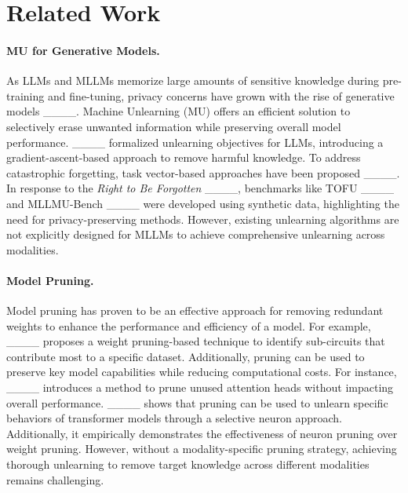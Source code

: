 \section{Related Work}
\paragraph{MU for Generative Models.}
As LLMs and MLLMs memorize large amounts of sensitive knowledge during pre-training and fine-tuning, privacy concerns have grown with the rise of generative models ____. 
Machine Unlearning (MU) offers an efficient solution to selectively erase unwanted information while preserving overall model performance. ____ formalized unlearning objectives for LLMs, introducing a gradient-ascent-based approach to remove harmful knowledge. 
To address catastrophic forgetting, task vector-based approaches have been proposed ____. In response to the \textit{Right to Be Forgotten} ____, benchmarks like TOFU ____ and MLLMU-Bench ____ were developed using synthetic data, highlighting the need for privacy-preserving methods. However, existing unlearning algorithms are not explicitly designed for MLLMs to achieve comprehensive unlearning across modalities.


\paragraph{Model Pruning.}
Model pruning has proven to be an effective approach for removing redundant weights to enhance the performance and efficiency of a model. 
For example, ____ proposes a weight pruning-based technique to identify sub-circuits that contribute most to a specific dataset. Additionally, pruning can be used to preserve key model capabilities while reducing computational costs. 
For instance, ____ introduces a method to prune unused attention heads without impacting overall performance. 
____ shows that pruning can be used to unlearn specific behaviors of transformer models through a selective neuron approach. 
Additionally, it empirically demonstrates the effectiveness of neuron pruning over weight pruning. However, without a modality-specific pruning strategy, achieving thorough unlearning to remove target knowledge across different modalities remains challenging.